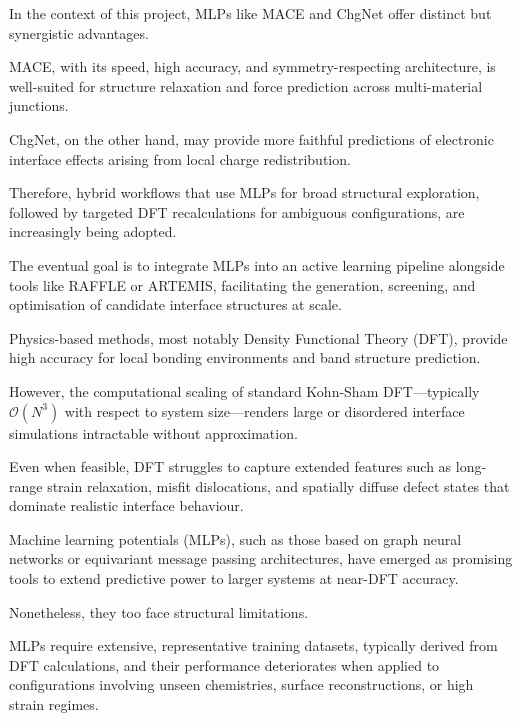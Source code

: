 In the context of this project, MLPs like MACE and ChgNet offer distinct but synergistic advantages.

MACE, with its speed, high accuracy, and symmetry-respecting architecture, is well-suited for structure relaxation and
force prediction across multi-material junctions.

ChgNet, on the other hand, may provide more faithful predictions of electronic interface effects arising from local
charge redistribution.


Therefore, hybrid workflows that use MLPs for broad structural exploration, followed by targeted DFT recalculations for
ambiguous configurations, are increasingly being adopted.


The eventual goal is to integrate MLPs into an active learning pipeline alongside tools like RAFFLE or ARTEMIS,
facilitating the generation, screening, and optimisation of candidate interface structures at scale.



Physics-based methods, most notably Density Functional Theory (DFT), provide high accuracy for local bonding
environments and band structure prediction.

However, the computational scaling of standard Kohn-Sham DFT---typically $\mathcal{O}(N^3)$ with respect to system
size---renders large or disordered interface simulations intractable without approximation.

Even when feasible, DFT struggles to capture extended features such as long-range strain relaxation, misfit
dislocations, and spatially diffuse defect states that dominate realistic interface behaviour.


Machine learning potentials (MLPs), such as those based on graph neural networks or equivariant message passing
architectures, have emerged as promising tools to extend predictive power to larger systems at near-DFT accuracy.

Nonetheless, they too face structural limitations.

MLPs require extensive, representative training datasets, typically derived from DFT calculations, and their performance
deteriorates when applied to configurations involving unseen chemistries, surface reconstructions, or high strain
regimes.

